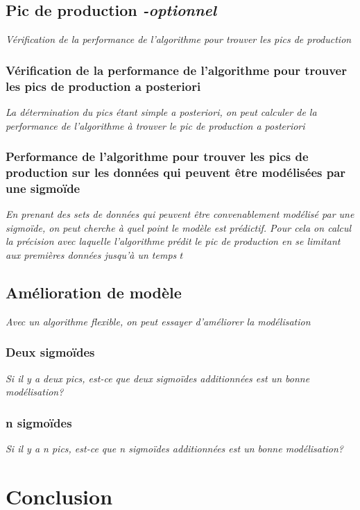\documentclass{article}
\begin{document}
\subsection{Pic de production \textit{-optionnel}}
\textit{Vérification de la performance de l'algorithme pour trouver les pics de production}

\subsubsection{Vérification de la performance de l'algorithme pour trouver les pics de production a posteriori}
\textit{La détermination du pics étant simple a posteriori, on peut calculer de la performance de l'algorithme à trouver le pic de production a posteriori}

\subsubsection{Performance de l'algorithme pour trouver les pics de production sur les données qui peuvent être modélisées par une sigmoïde}
\textit{En prenant des sets de données qui peuvent être convenablement modélisé par une sigmoïde, on peut cherche à quel point le modèle est prédictif. Pour cela on calcul la précision avec laquelle l'algorithme prédit le pic de production en se limitant aux premières données jusqu'à un temps $t$}

\subsection{Amélioration de modèle}
\textit{Avec un algorithme flexible, on peut essayer d'améliorer la modélisation}

\subsubsection{Deux sigmoïdes}
\textit{Si il y a deux pics, est-ce que deux sigmoïdes additionnées est un bonne modélisation?}

\subsubsection{n sigmoïdes}
\textit{Si il y a n pics, est-ce que n sigmoïdes additionnées est un bonne modélisation?}

\section{Conclusion}
\end{document}
